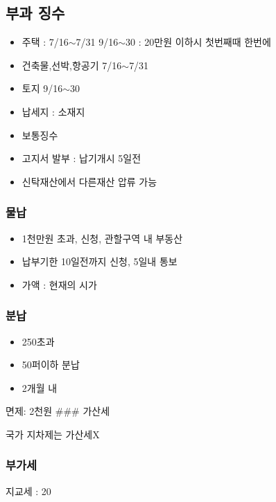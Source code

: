 \documentclass{oblivoir}
\begin{document}
\begin{multicols}{2}
\subsection{부과 징수}\label{uxbd80uxacfc-uxc9d5uxc218-1}

\begin{itemize}
\item
  주택 : 7/16$\sim$7/31 9/16$\sim$30 : 20만원
  이하시 첫번째때 한번에
\item
  건축물,선박,항공기 7/16$\sim$7/31
\item
  토지 9/16$\sim$30
\item
  납세지 : 소재지
\item
  보통징수
\item
  고지서 발부 : 납기개시 5일전
\item
  신탁재산에서 다른재산 압류 가능
\end{itemize}

\subsubsection{물납}\label{uxbb3cuxb0a9}

\begin{itemize}
\itemsep1pt\parskip0pt
\item
  1천만원 초과, 신청, 관할구역 내 부동산
\item
  납부기한 10일전까지 신청, 5일내 통보
\item
  가액 : 현재의 시가
\end{itemize}

\subsubsection{분납}\label{uxbd84uxb0a9}

\begin{itemize}
\itemsep1pt\parskip0pt
\item
  250초과
\item
  50퍼이하 분납
\item
  2개월 내
\end{itemize}

면제: 2천원 \#\#\# 가산세

국가 지차제는 가산세X

\subsubsection{부가세}\label{uxbd80uxac00uxc138}

지교세 : 20


\end{multicols}
\end{document}
